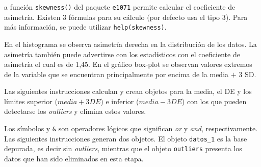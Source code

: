 \documentclass[11pt,b5paper,]{krantz}
\newenvironment{Shaded}{}{}
\newcommand{\KeywordTok}[1]{\textcolor[rgb]{0.00,0.44,0.13}{\textbf{#1}}}
\newcommand{\DecValTok}[1]{\textcolor[rgb]{0.25,0.63,0.44}{#1}}
\newcommand{\StringTok}[1]{\textcolor[rgb]{0.25,0.44,0.63}{#1}}
\newcommand{\CommentTok}[1]{\textcolor[rgb]{0.38,0.63,0.69}{\textit{#1}}}
\newcommand{\OperatorTok}[1]{\textcolor[rgb]{0.40,0.40,0.40}{#1}}
\newcommand{\NormalTok}[1]{#1}
\begin{document}
a función \texttt{skewness()} del paquete \texttt{e1071} permite
calcular el coeficiente de asimetría. Existen 3 fórmulas para su cálculo
(por defecto usa el tipo 3). Para más información, se puede utilizar
\texttt{help(skewness)}.

\begin{Shaded}
\end{Shaded}

En el histograma se observa asimetría derecha en la distribución de los
datos. La asimetría también puede advertirse con los estadísticos con el
coeficiente de asimetría el cual es de 1,45. En el gráfico box-plot se
observan valores extremos de la variable que se encuentran
principalmente por encima de la media \(+\) 3 SD.

Las siguientes instrucciones calculan y crean objetos para la media, el
DE y los límites superior (\(media + 3DE\)) e inferior (\(media - 3DE\))
con los que pueden detectarse los \emph{outliers} y elimina estos
valores.

\begin{Shaded}
\end{Shaded}

Los símbolos \texttt{\textbar{}} y \texttt{\&} son operadores lógicos
que significan \emph{or} y \emph{and}, respectivamente. Las siguientes
instrucciones generan dos objetos. El objeto \texttt{datos\_1} es la
base depurada, es decir sin \emph{outliers}, mientras que el objeto
\texttt{outliers} presenta los datos que han sido eliminados en esta
etapa.

\begin{Shaded}
\end{Shaded}
\end{document}
